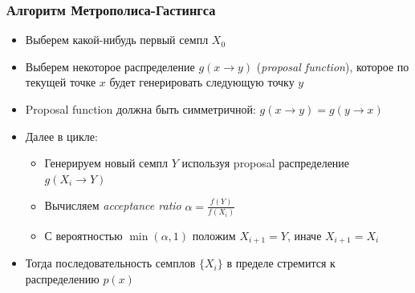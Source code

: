 \documentclass[10pt]{beamer}
\begin{document}
\begin{frame}
\frametitle{Алгоритм Метрополиса-Гастингса}
\begin{itemize}
\item Выберем какой-нибудь первый семпл \begin{math}X_0\end{math}
\pause
\item Выберем некоторое распределение \begin{math}g(x \rightarrow y)\end{math} (\textit{proposal function}), которое по текущей точке \begin{math}x\end{math} будет генерировать следующую точку \begin{math}y\end{math}
\pause
\item Proposal function должна быть симметричной: \begin{math}g(x \rightarrow y) = g(y \rightarrow x)\end{math}
\pause
\item Далее в цикле:
\pause
\begin{itemize}
\item Генерируем новый семпл \begin{math}Y\end{math} используя proposal распределение \begin{math}g(X_i \rightarrow Y)\end{math}
\pause
\item Вычисляем \textit{acceptance ratio} \begin{math}\alpha = \frac{f(Y)}{f(X_i)}\end{math}
\pause
\item С вероятностью \begin{math}\min(\alpha, 1)\end{math} положим \begin{math}X_{i+1} = Y\end{math}, иначе \begin{math}X_{i+1} = X_i\end{math}
\end{itemize}
\pause
\item Тогда последовательность семплов \begin{math}\{X_i\}\end{math} в пределе стремится к распределению \begin{math}p(x)\end{math}
\end{itemize}
\end{frame}
\end{document}
